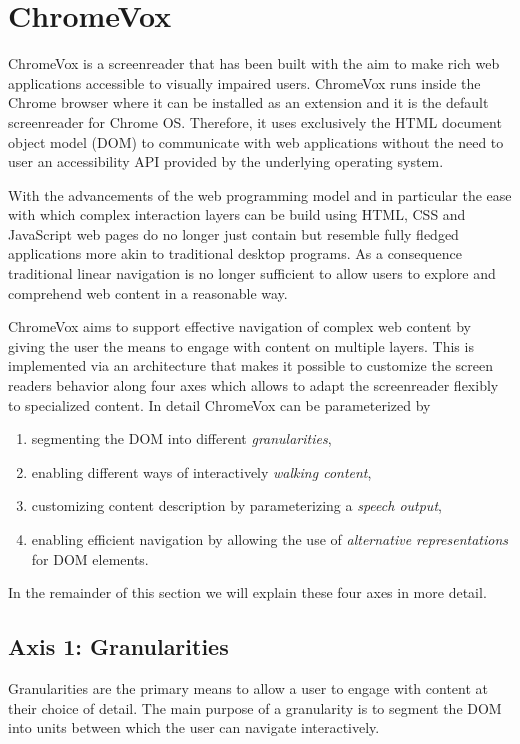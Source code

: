 \documentclass{acm_proc_article-sp}
\begin{document}
\section{ChromeVox}
\label{sec:chromevox}

ChromeVox is a screenreader that has been built with the aim to make rich web
applications accessible to visually impaired users. ChromeVox runs inside the
Chrome browser where it can be installed as an extension and it is the default
screenreader for Chrome OS. Therefore, it uses exclusively the HTML document
object model (DOM) to communicate with web applications without the need to user
an accessibility API provided by the underlying operating system.

With the advancements of the web programming model and in particular the ease
with which complex interaction layers can be build using HTML, CSS and
JavaScript web pages do no longer just contain but resemble fully fledged
applications more akin to traditional desktop programs. As a consequence
traditional linear navigation is no longer sufficient to allow users to explore
and comprehend web content in a reasonable way.

ChromeVox aims to support effective navigation of complex web content by giving
the user the means to engage with content on multiple layers. This is
implemented via an architecture that makes it possible to customize the screen
readers behavior along four axes which allows to adapt the screenreader
flexibly to specialized content. In detail ChromeVox can be parameterized by 
\begin{enumerate}[(1)]
\item segmenting the DOM into different \emph{granularities},
\item enabling different ways of interactively \emph{walking content},
\item customizing content description by parameterizing a \emph{speech output},
\item enabling efficient navigation by allowing the use of \emph{alternative
    representations} for DOM elements.
\end{enumerate}
In the remainder of this section we will explain these four axes in more detail.


\subsection{Axis 1: Granularities}
\label{sec:ax1}

Granularities are the primary means to allow a user to engage with content at
their choice of detail. The main purpose of a granularity is to segment the DOM
into units between which the user can navigate interactively.
\end{document}
